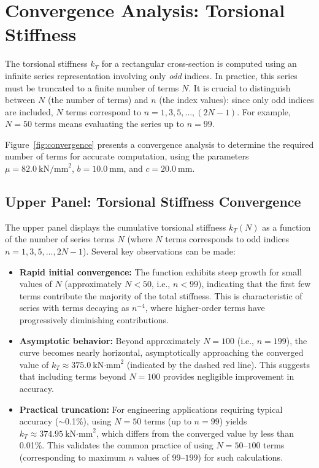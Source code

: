 
\section*{Convergence Analysis: Torsional Stiffness}

The torsional stiffness $k_T$ for a rectangular cross-section is computed using an infinite series representation involving only \textit{odd} indices. In practice, this series must be truncated to a finite number of terms $N$. It is crucial to distinguish between $N$ (the number of terms) and $n$ (the index values): since only odd indices are included, $N$ terms correspond to $n = 1, 3, 5, \ldots, (2N-1)$. For example, $N=50$ terms means evaluating the series up to $n=99$.

Figure~\ref{fig:convergence} presents a convergence analysis to determine the required number of terms for accurate computation, using the parameters $\mu = 82.0~\text{kN/mm}^2$, $b = 10.0~\text{mm}$, and $c = 20.0~\text{mm}$.

\subsection*{Upper Panel: Torsional Stiffness Convergence}

The upper panel displays the cumulative torsional stiffness $k_T(N)$ as a function of the number of series terms $N$ (where $N$ terms corresponds to odd indices $n = 1, 3, 5, \ldots, 2N-1$). Several key observations can be made:

\begin{itemize}
    \item \textbf{Rapid initial convergence:} The function exhibits steep growth for small values of $N$ (approximately $N < 50$, i.e., $n < 99$), indicating that the first few terms contribute the majority of the total stiffness. This is characteristic of series with terms decaying as $n^{-4}$, where higher-order terms have progressively diminishing contributions.
    
    \item \textbf{Asymptotic behavior:} Beyond approximately $N = 100$ (i.e., $n = 199$), the curve becomes nearly horizontal, asymptotically approaching the converged value of $k_T \approx 375.0~\text{kN·mm}^2$ (indicated by the dashed red line). This suggests that including terms beyond $N = 100$ provides negligible improvement in accuracy.
    
    \item \textbf{Practical truncation:} For engineering applications requiring typical accuracy ($\sim$0.1\%), using $N = 50$ terms (up to $n=99$) yields $k_T \approx 374.95~\text{kN·mm}^2$, which differs from the converged value by less than 0.01\%. This validates the common practice of using $N = 50$--$100$ terms (corresponding to maximum $n$ values of $99$--$199$) for such calculations.
\end{itemize}


